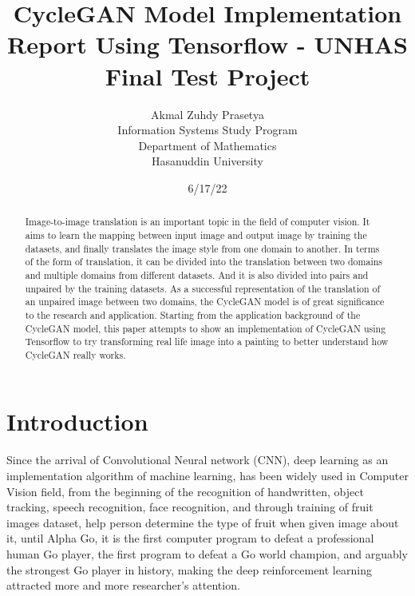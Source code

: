 \documentclass[peerreview]{IEEEtran}
\begin{document}
\title{CycleGAN Model Implementation Report Using Tensorflow - UNHAS Final Test Project}



\author{Akmal Zuhdy Prasetya \\
Information Systems Study Program \\
Department of Mathematics \\
Hasanuddin University\\
}
\date{6/17/22}

\maketitle
\tableofcontents
\listoffigures
\listoftables

\IEEEpeerreviewmaketitle
\begin{abstract}
Image-to-image translation is an important topic in the field of computer vision. It aims to learn the mapping between input image and output image by training the datasets, and finally translates the image style from one domain to another. In terms of the form of translation, it can be divided into the translation between two domains and multiple domains from different datasets. And it is also divided into pairs and unpaired by the training datasets. As a successful representation of the translation of an unpaired image between two domains, the CycleGAN model is of great significance to the research and application. Starting from the application background of the CycleGAN model, this paper attempts to show an implementation of CycleGAN using Tensorflow to try transforming real life image into a painting to better understand how CycleGAN really works.

\end{abstract}


\section{Introduction}

Since the arrival of Convolutional Neural network (CNN), deep learning as an implementation algorithm of machine learning, has been widely used in Computer Vision field, from the beginning of the recognition of handwritten, object tracking, speech recognition, face recognition, and through training of fruit images dataset, help person determine the type of fruit when given image about it, until Alpha Go, it is the first computer program to defeat a professional human Go player, the first program to defeat a Go world champion, and arguably the strongest Go player in history, making the deep reinforcement learning attracted more and more researcher's attention.
\end{document}
